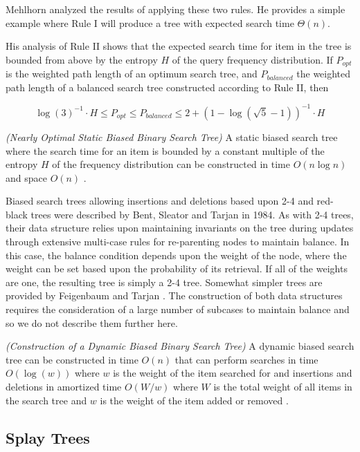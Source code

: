 \documentclass[mcs]{scsthesis}
\begin{document}
Mehlhorn \cite{mehlhorn} analyzed the results of applying these two rules. He
provides a simple example where Rule I will produce a tree with expected
search time \(\Theta(n)\).

His analysis of Rule II shows that the expected search time for item in the tree
is bounded from above by the entropy \(H\) of the query frequency distribution.
If $P_{opt}$ is the weighted path length of an optimum search tree, and
$P_{balanced}$ the weighted path length of a balanced search tree constructed
according to Rule II, then

$$
{\log(3)}^{-1} \cdot H \le P_{opt} \le P_{balanced} \le 2 + {(1 - \log(\sqrt 5 - 1))}^{-1} \cdot H
$$

\begin{thm} \emph{(Nearly Optimal Static Biased Binary Search Tree)} 
A static biased search tree where the search time for an item is bounded by
a constant multiple of the entropy \(H\) of the frequency distribution can be
constructed in time \(O(n \log n)\) and space \(O(n)\) \cite{mehlhorn}.
\end{thm}

Biased search trees allowing insertions and deletions based upon 2-4 and
red-black trees were described by Bent, Sleator and Tarjan \cite{bst} in 1984.
As with 2-4 trees, their data structure relies upon maintaining invariants
on the tree during updates through extensive multi-case rules for re-parenting
nodes to maintain balance. In this case, the balance condition depends upon the
weight of the node, where the weight can be set based upon the probability of
its retrieval. If all of the weights are one, the resulting tree is simply a 2-4
tree. Somewhat simpler trees are provided by Feigenbaum and Tarjan \cite{bst2}.
The construction of both data structures requires the consideration of a large
number of subcases to maintain balance and so we do not describe them further
here.

\begin{thm} \emph{(Construction of a Dynamic Biased Binary Search Tree)} 
A dynamic biased search tree can be constructed in time \(O(n)\) that can
perform searches in time \(O(\log(w))\) where \(w\) is the weight of the item
searched for and insertions and deletions in amortized time \(O(W / w)\)
where \(W\) is the total weight of all items in the search tree and \(w\) is
the weight of the item added or removed \cite{bst2}.
\end{thm}

\subsection{Splay Trees}
\end{document}
